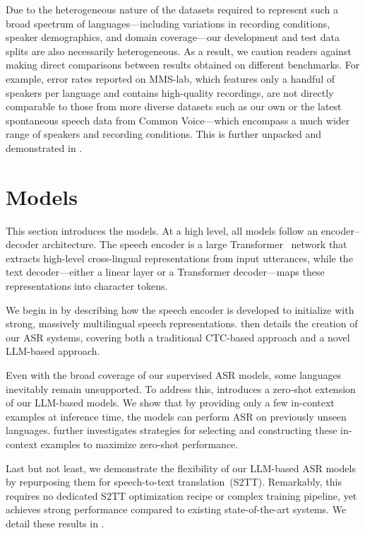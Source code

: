 \documentclass[]{fairmeta}
\begin{document}
Due to the heterogeneous nature of the datasets required to represent such a broad spectrum of languages---including variations in recording conditions, speaker demographics, and domain coverage---our development and test data splits are also necessarily heterogeneous. As a result, we caution readers against making direct comparisons between results obtained on different benchmarks. For example, error rates reported on MMS-lab, which features only a handful of speakers per language and contains high-quality recordings, are not directly comparable to those from more diverse datasets such as our own \vendorcorpus or the latest spontaneous speech data from Common Voice---which encompass a much wider range of speakers and recording conditions. This is further unpacked and demonstrated in .

\section{\OmniASR Models}
\label{section:models}

This section introduces the \OmniASR models. At a high level, all models follow an encoder–decoder architecture. The speech encoder is a large Transformer~\citep{vaswani2017attention} network that extracts high-level cross-lingual representations from input utterances, while the text decoder—either a linear layer or a Transformer decoder—maps these representations into character tokens.

We begin in  by describing how the speech encoder is developed to initialize with strong, massively multilingual speech representations.  then details the creation of our ASR systems, covering both a traditional CTC-based approach and a novel LLM-based approach.

Even with the broad coverage of our supervised ASR models, some languages inevitably remain unsupported. To address this,  introduces a zero-shot extension of our LLM-based models. We show that by providing only a few in-context examples at inference time, the models can perform ASR on previously unseen languages.  further investigates strategies for selecting and constructing these in-context examples to maximize zero-shot performance.

Last but not least, we demonstrate the flexibility of our LLM-based ASR models by repurposing them for speech-to-text translation~(S2TT). Remarkably, this requires no dedicated S2TT optimization recipe or complex training pipeline, yet achieves strong performance compared to existing state-of-the-art systems. We detail these results in .
\end{document}
